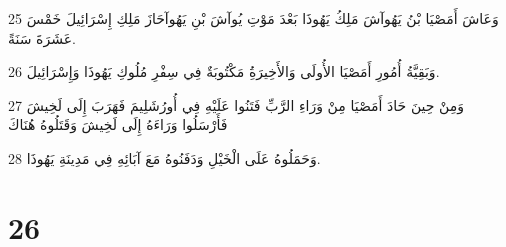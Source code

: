 \par 25 وَعَاشَ أَمَصْيَا بْنُ يَهُوآشَ مَلِكُ يَهُوذَا بَعْدَ مَوْتِ يُوآشَ بْنِ يَهُوآحَازَ مَلِكِ إِسْرَائِيلَ خَمْسَ عَشَرَةَ سَنَةً.
\par 26 وَبَقِيَّةُ أُمُورِ أَمَصْيَا الأُولَى وَالأَخِيرَةُِ مَكْتُوبَةٌ فِي سِفْرِ مُلُوكِ يَهُوذَا وَإِسْرَائِيلَ.
\par 27 وَمِنْ حِينَ حَادَ أَمَصْيَا مِنْ وَرَاءِ الرَّبِّ فَتَنُوا عَلَيْهِ فِي أُورُشَلِيمَ فَهَرَبَ إِلَى لَخِيشَ فَأَرْسَلُوا وَرَاءَهُ إِلَى لَخِيشَ وَقَتَلُوهُ هُنَاكَ
\par 28 وَحَمَلُوهُ عَلَى الْخَيْلِ وَدَفَنُوهُ مَعَ آبَائِهِ فِي مَدِينَةِ يَهُوذَا.

\chapter{26}

